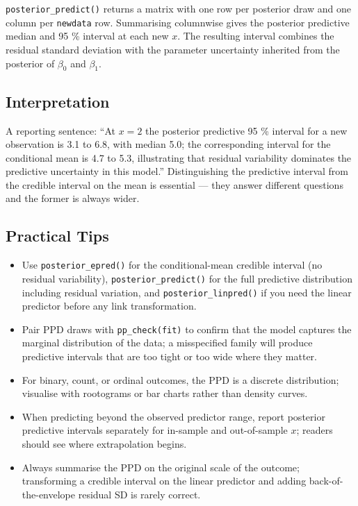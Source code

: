 \documentclass[
]{article}
\providecommand{\tightlist}{%
  \setlength{\itemsep}{0pt}\setlength{\parskip}{0pt}}
\begin{document}
\texttt{posterior\_predict()} returns a matrix with one row per
posterior draw and one column per \texttt{newdata} row. Summarising
columnwise gives the posterior predictive median and 95 \% interval at
each new \(x\). The resulting interval combines the residual standard
deviation with the parameter uncertainty inherited from the posterior of
\(\beta_0\) and \(\beta_1\).

\subsection{Interpretation}\label{interpretation}

A reporting sentence: ``At \(x = 2\) the posterior predictive 95 \%
interval for a new observation is 3.1 to 6.8, with median 5.0; the
corresponding interval for the conditional mean is 4.7 to 5.3,
illustrating that residual variability dominates the predictive
uncertainty in this model.'' Distinguishing the predictive interval from
the credible interval on the mean is essential --- they answer different
questions and the former is always wider.

\subsection{Practical Tips}\label{practical-tips}

\begin{itemize}
\tightlist
\item
  Use \texttt{posterior\_epred()} for the conditional-mean credible
  interval (no residual variability), \texttt{posterior\_predict()} for
  the full predictive distribution including residual variation, and
  \texttt{posterior\_linpred()} if you need the linear predictor before
  any link transformation.
\item
  Pair PPD draws with \texttt{pp\_check(fit)} to confirm that the model
  captures the marginal distribution of the data; a misspecified family
  will produce predictive intervals that are too tight or too wide where
  they matter.
\item
  For binary, count, or ordinal outcomes, the PPD is a discrete
  distribution; visualise with rootograms or bar charts rather than
  density curves.
\item
  When predicting beyond the observed predictor range, report posterior
  predictive intervals separately for in-sample and out-of-sample \(x\);
  readers should see where extrapolation begins.
\item
  Always summarise the PPD on the original scale of the outcome;
  transforming a credible interval on the linear predictor and adding
  back-of-the-envelope residual SD is rarely correct.
\end{itemize}
\end{document}
